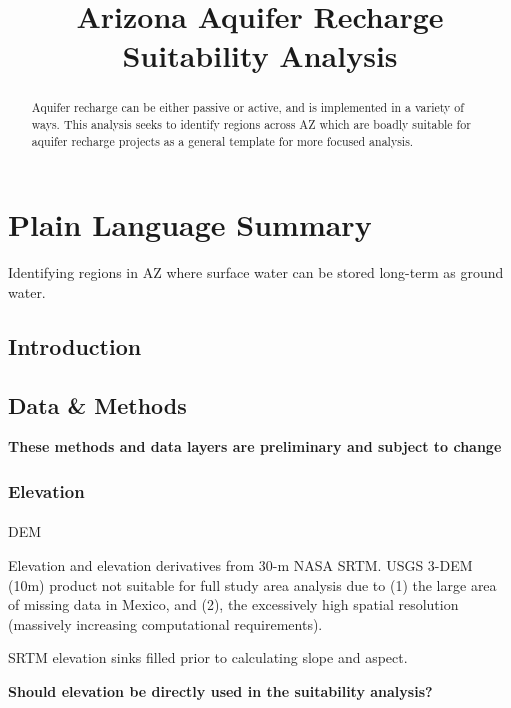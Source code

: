 \documentclass[
]{agujournal2019}
\makeatletter
\let\oldparagraph\paragraph
\renewcommand{\paragraph}{
    \@ifstar
      \xxxParagraphStar
      \xxxParagraphNoStar
  }
\newcommand{\xxxParagraphStar}[1]{\oldparagraph*{#1}\mbox{}}
\newcommand{\xxxParagraphNoStar}[1]{\oldparagraph{#1}\mbox{}}
\makeatother
\begin{document}
\title{Arizona Aquifer Recharge Suitability Analysis}



\begin{abstract}
Aquifer recharge can be either passive or active, and is implemented in
a variety of ways. This analysis seeks to identify regions across AZ
which are boadly suitable for aquifer recharge projects as a general
template for more focused analysis.
\end{abstract}

\section*{Plain Language Summary}
Identifying regions in AZ where surface water can be stored long-term as
ground water.




\subsection{Introduction}\label{introduction}

\subsection{Data \& Methods}\label{sec-data-methods}

\textbf{These methods and data layers are preliminary and subject to
change}

\subsubsection{Elevation}\label{elevation}

\paragraph{DEM}\label{dem}

Elevation and elevation derivatives from 30-m NASA SRTM. USGS 3-DEM
(10m) product not suitable for full study area analysis due to (1) the
large area of missing data in Mexico, and (2), the excessively high
spatial resolution (massively increasing computational requirements).

SRTM elevation sinks filled prior to calculating slope and aspect.

\textbf{Should elevation be directly used in the suitability analysis?}
\end{document}
